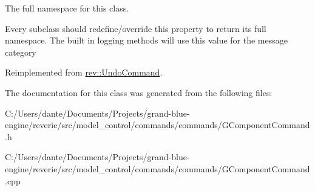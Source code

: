 The full namespace for this class. 

Every subclass should redefine/override this property to return its full namespace. The built in logging methods will use this value for the message category 

Reimplemented from \mbox{\hyperlink{classrev_1_1_undo_command_aea7ceb3f5ea266e697f01a65da7afec5}{rev\+::\+Undo\+Command}}.



The documentation for this class was generated from the following files\+:\begin{DoxyCompactItemize}
\item 
C\+:/\+Users/dante/\+Documents/\+Projects/grand-\/blue-\/engine/reverie/src/model\+\_\+control/commands/commands/G\+Component\+Command.\+h\item 
C\+:/\+Users/dante/\+Documents/\+Projects/grand-\/blue-\/engine/reverie/src/model\+\_\+control/commands/commands/G\+Component\+Command.\+cpp\end{DoxyCompactItemize}
